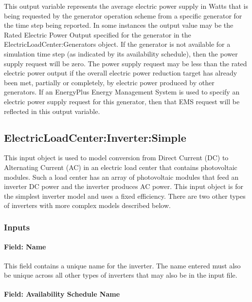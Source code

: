 This output variable represents the average electric power supply in Watts that is being requested by the generator operation scheme from a specific generator for the time step being reported. In some instances the output value may be the Rated Electric Power Output specified for the generator in the ElectricLoadCenter:Generators object. If the generator is not available for a simulation time step (as indicated by its availability schedule), then the power supply request will be zero. The power supply request may be less than the rated electric power output if the overall electric power reduction target has already been met, partially or completely, by electric power produced by other generators. If an EnergyPlus Energy Management System is used to specify an electric power supply request for this generator, then that EMS request will be reflected in this output variable.

\subsection{ElectricLoadCenter:Inverter:Simple}\label{electricloadcenterinvertersimple}

This input object is used to model conversion from Direct Current (DC) to Alternating Current (AC) in an electric load center that contains photovoltaic modules. Such a load center has an array of photovoltaic modules that feed an inverter DC power and the inverter produces AC power. This input object is for the simplest inverter model and uses a fixed efficiency. There are two other types of inverters with more complex models described below.

\subsubsection{Inputs}\label{inputs-3-010}

\paragraph{Field: Name}\label{field-name-2-010}

This field contains a unique name for the inverter. The name entered must also be unique across all other types of inverters that may also be in the input file.

\paragraph{Field: Availability Schedule Name}\label{field-availability-schedule-name-1-003}

